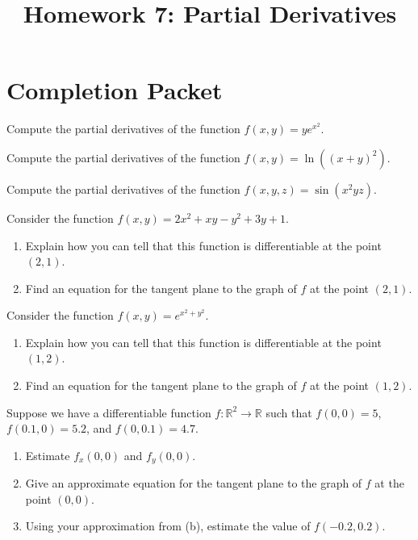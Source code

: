\documentclass{ximera}
\title{Homework 7: Partial Derivatives}
\begin{document}
\begin{abstract}
\end{abstract}
\maketitle

\section*{Completion Packet}

\begin{problem}
Compute the partial derivatives of the function $f(x,y) = ye^{x^2}$.
\end{problem}

\begin{problem}
Compute the partial derivatives of the function $f(x,y) = \ln((x+y)^2)$.
\end{problem}

\begin{problem}
Compute the partial derivatives of the function $f(x,y,z) = \sin(x^2yz)$.
\end{problem}

\begin{problem}
Consider the function $f(x,y) = 2x^2 + xy -y^2 + 3y + 1$.
\begin{enumerate}
\item Explain how you can tell that this function is differentiable at the point $(2,1)$.
\item Find an equation for the tangent plane to the graph of $f$ at the point $(2,1)$.
\end{enumerate}
\end{problem}

\begin{problem}
Consider the function $f(x,y) = e^{x^2+y^2}$.
\begin{enumerate}
\item Explain how you can tell that this function is differentiable at the point $(1,2)$.
\item Find an equation for the tangent plane to the graph of $f$ at the point $(1,2)$.
\end{enumerate}
\end{problem}

\begin{problem}
Suppose we have a differentiable function $f:\mathbb{R}^2\rightarrow\mathbb{R}$ such that $f(0,0) = 5$, $f(0.1, 0) = 5.2$, and $f(0,0.1) = 4.7$.
\begin{enumerate}
\item Estimate $f_x(0,0)$ and $f_y(0,0)$.
\item Give an approximate equation for the tangent plane to the graph of $f$ at the point $(0,0)$.
\item Using your approximation from (b), estimate the value of $f(-0.2, 0.2)$.
\end{enumerate}
\end{problem}
\end{document}
